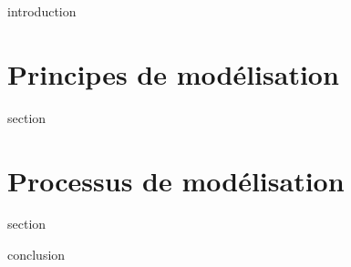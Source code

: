 \chaptertoc{}

\label{sec:4-int}
{introduction}

\section{Principes de modélisation}
\label{sec:4-1}
{section}

\section{Processus de modélisation}
\label{sec:4-2}
{section}

\label{sec:4-cnc}
{conclusion}


